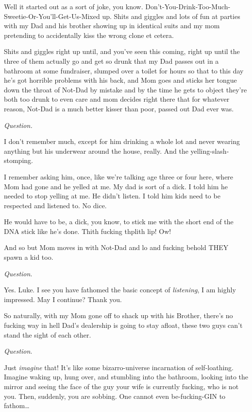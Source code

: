 Well it started out as a sort of joke, you know.
Don't-You-Drink-Too-Much-Sweetie-Or-You'll-Get-Us-Mixed
up. Shits and giggles and lots of fun at parties with my Dad and
his brother showing up in identical suits and my mom pretending to
accidentally kiss the wrong clone et cetera.

Shits and giggles right up until, and you've seen this
coming, right up until the three of them actually go and get so
drunk that my Dad passes out in a bathroom at some fundraiser,
slumped over a toilet for hours so that to this day he's got
horrible problems with his back, and Mom goes and sticks her tongue
down the throat of Not-Dad by mistake and by the time he gets to
object they're both too drunk to even care and mom decides
right there that for whatever reason, Not-Dad is a much better
kisser than poor, passed out Dad ever was.



{\em Question.}



I don't remember much, except for him drinking a whole lot
and never wearing anything but his underwear around the house,
really. And the yelling-slash-stomping.

I remember asking him, once, like we're talking age three or
four here, where Mom had gone and he yelled at me. My dad is sort
of a dick. I told him he needed to stop yelling at me. He
didn't listen. I told him kids need to be respected and
listened to. No dice.

He would have to be, a dick, you know, to stick me with the short
end of the DNA stick like he's done. Thith fucking thplith
lip! Ow!

And so but Mom moves in with Not-Dad and lo and fucking behold THEY
spawn a kid too.



{\em Question}.



Yes. Luke. I see you have fathomed the basic concept of
{\em listening}, I am highly impressed. May I continue? Thank
you.

So naturally, with my Mom gone off to shack up with his Brother,
there's no fucking way in hell Dad's dealership is going to
stay afloat, these two guys can't stand the sight of each
other.



{\em Question}.



Just {\em imagine} that! It's like some bizarro-universe
incarnation of self-loathing. Imagine waking up, hung over, and
stumbling into the bathroom, looking into the mirror and seeing the
face of the guy your wife is currently fucking, who is not you.
Then, suddenly, you are sobbing. One cannot even be-fucking-GIN to
fathom{\ldots}

